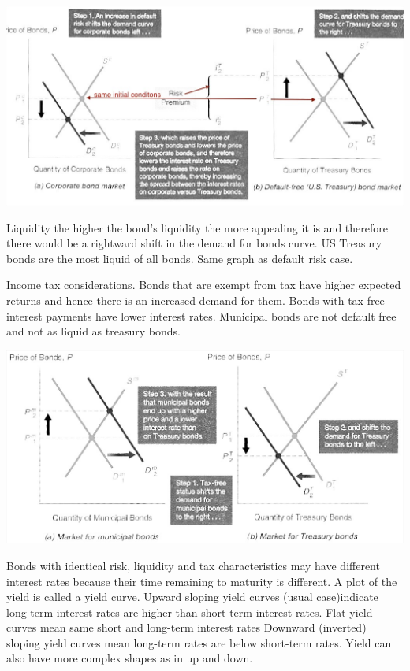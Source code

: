 \documentclass[12pt]{examnotes}
\begin{document}
\includegraphics[scale=0.45]{./imgs/61.jpg}

 Liquidity 
\rna the higher the bond's liquidity the more appealing it is and therefore there would be a rightward shift in the demand for bonds curve.
\rna  US Treasury bonds are the most liquid of all bonds. 
\rna Same graph as default risk case.

 Income tax considerations. 
\rna Bonds that are exempt from tax have higher expected returns and hence there is an increased demand for them.
\rna Bonds with tax free interest payments have lower interest rates.
\rna Municipal bonds are not default free and not as liquid as treasury bonds.

\includegraphics[scale=0.45]{./imgs/62.jpg}

\ra Bonds with identical risk, liquidity and tax characteristics may have different interest rates because their time remaining to maturity is different. A plot of the yield is called a yield curve. 
\ra Upward sloping yield curves (usual case)indicate long-term interest rates are higher than short term interest rates. 
\ra Flat yield curves mean same short and long-term interest rates
\ra Downward (inverted) sloping yield curves mean long-term rates are below short-term rates.
\ra Yield can also have more complex shapes as in up and down.
\end{document}
